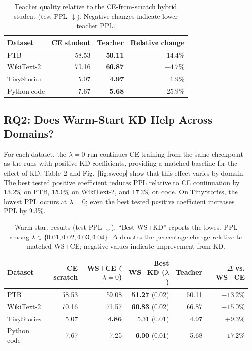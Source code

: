\documentclass[conference]{IEEEtran}
\newcommand{\best}[1]{\textbf{#1}}
\begin{document}
\begin{table}[t]
\caption{Teacher quality relative to the CE-from-scratch hybrid student (test
PPL $\downarrow$).  Negative changes indicate lower teacher PPL.}
\label{tab:teachers}
\centering
\footnotesize
\setlength{\tabcolsep}{4.2pt}
\begin{tabular}{lrrr}
\toprule
Dataset & CE student & Teacher & Relative change \\
\midrule
PTB & 58.53 & \best{50.11} & $-14.4\%$ \\
WikiText-2 & 70.16 & \best{66.87} & $-4.7\%$ \\
TinyStories & 5.07 & \best{4.97} & $-1.9\%$ \\
Python code & 7.67 & \best{5.68} & $-25.9\%$ \\
\bottomrule
\end{tabular}
\end{table}

\subsection{RQ2: Does Warm-Start KD Help Across Domains?}

For each dataset, the $\lambda=0$ run continues CE training from the same
checkpoint as the runs with positive KD coefficients, providing a matched
baseline for the effect of KD.  Table~\ref{tab:warmstart} and
Fig.~\ref{fig:sweep} show that this effect varies by domain.  The best tested
positive coefficient reduces PPL relative to CE continuation by 13.2\% on
PTB, 15.0\% on WikiText-2, and 17.2\% on code.  On TinyStories, the lowest
PPL occurs at $\lambda=0$; even the best tested positive coefficient
increases PPL by 9.3\%.

\begin{table}[t]
\caption{Warm-start results (test PPL $\downarrow$).  ``Best WS+KD'' reports
the lowest PPL among $\lambda\in\{0.01,0.02,0.03,0.04\}$.
$\Delta$ denotes the percentage change relative to matched WS+CE; negative
values indicate improvement from KD.}
\label{tab:warmstart}
\centering
\small
\setlength{\tabcolsep}{7pt}
\begin{tabular}{lrrrrr}
\toprule
Dataset & CE scratch & WS+CE ($\lambda=0$) & Best WS+KD ($\lambda$) & Teacher & $\Delta$ vs. WS+CE \\
\midrule
PTB & 58.53 & 59.08 & \best{51.27} (0.02) & 50.11 & \best{$-13.2\%$} \\
WikiText-2 & 70.16 & 71.57 & \best{60.83} (0.02) & 66.87 & \best{$-15.0\%$} \\
TinyStories & 5.07 & \best{4.86} & 5.31 (0.01) & 4.97 & $+9.3\%$ \\
Python code & 7.67 & 7.25 & \best{6.00} (0.01) & 5.68 & \best{$-17.2\%$} \\
\bottomrule
\end{tabular}
\end{table}
\end{document}
